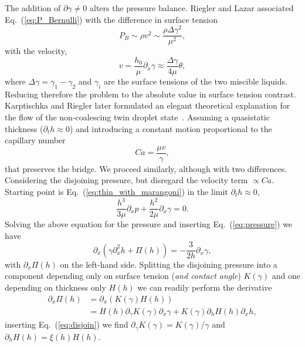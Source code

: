 \documentclass[twocolumn,amsmath,amssymb,showpacs,pre,nofootinbib,superscriptaddress]{revtex4-1} %
\begin{document}
The addition of $\partial\gamma \neq 0$ alters the pressure balance.
Riegler and Lazar associated Eq.~(\ref{eq:P_Bernulli}) with the difference in surface tension~\cite{doi:10.1021/la800630w}
\begin{equation}\label{eq:P_bernulli_riegler}
    P_{B} \sim \rho v^2 \sim \frac{\rho \Delta\gamma^2}{\mu^2}, 
\end{equation}
with the velocity,
\begin{equation}\label{eq:vel_riegler}
    v = \frac{h_0}{\mu}\partial_x\gamma\approx\frac{\Delta\gamma}{4\mu}\theta,
\end{equation}
where $\Delta\gamma = \gamma_1 - \gamma_2$ and $\gamma_i$ are the surface tensions of the two miscible liquids.
Reducing therefore the problem to the absolute value in surface tension contrast.
Karptischka and Riegler later formulated an elegant theoretical explanation for the flow of the non-coalescing twin droplet state~\cite{PhysRevLett.109.066103}.
Assuming a quasistatic thickness ($\partial_t h \approx 0$) and introducing a constant motion proportional to the capillary number 
\begin{equation}\label{eq:sys_cap_vel}
    Ca = \frac{\mu v}{\gamma},
\end{equation} 
that preserves the bridge. 
We proceed similarly, although with two differences. 
Considering the disjoining pressure, but disregard the velocity term $\propto Ca$.
Starting point is Eq.~(\ref{eq:thin_with_marangoni}) in the limit $\partial_t h \approx 0$, 
\begin{equation}\label{eq:pressure_noncoal}
    \frac{h^3}{3\mu}\partial_x p + \frac{h^2}{2\mu}\partial_x\gamma = 0.
\end{equation}
Solving the above equation for the pressure and inserting Eq.~(\ref{eq:pressure}) we have
\begin{equation}\label{eq:thin_film_quasistatic_pressure}
    \partial_x (\gamma\partial_x^2 h + \Pi(h)) = - \frac{3}{2 h}\partial_x\gamma,
\end{equation}
with $\partial_x\Pi(h)$ on the left-hand side.
Splitting the disjoining pressure into a component depending only on surface tension (\textit{and contact angle}) $K(\gamma)$ and one depending on thickness only $H(h)$ we can readily perform the derivative
\begin{align}\label{eq:disj_derivative1}
    \partial_x\Pi(h) &= \partial_x (K(\gamma)H(h)) \nonumber\\
    &= H(h)\partial_\gamma K(\gamma)\partial_x\gamma + K(\gamma)\partial_h H(h)\partial_x h,
\end{align}
inserting Eq.~(\ref{eq:disjoin}) we find $\partial_\gamma K(\gamma) =K(\gamma)/\gamma$ and $\partial_h H(h) = \xi(h)H(h)$.
\end{document}
